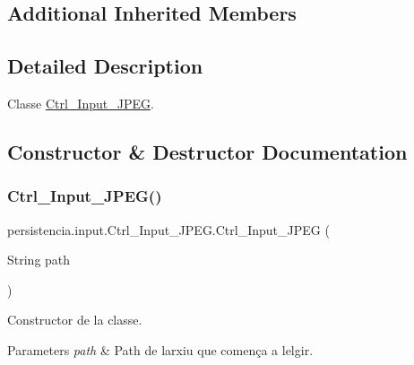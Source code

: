 \subsection*{Additional Inherited Members}


\subsection{Detailed Description}
Classe \hyperlink{classpersistencia_1_1input_1_1Ctrl__Input__JPEG}{Ctrl\+\_\+\+Input\+\_\+\+J\+P\+EG}. 

\subsection{Constructor \& Destructor Documentation}
\mbox{\label{classpersistencia_1_1input_1_1Ctrl__Input__JPEG_aa7d81dfa6240a7ee82e5188fc2600c58}} 
\subsubsection{\texorpdfstring{Ctrl\+\_\+\+Input\+\_\+\+J\+P\+E\+G()}{Ctrl\_Input\_JPEG()}\hspace{0.1cm}{\footnotesize\ttfamily [1/2]}}
{\footnotesize\ttfamily persistencia.\+input.\+Ctrl\+\_\+\+Input\+\_\+\+J\+P\+E\+G.\+Ctrl\+\_\+\+Input\+\_\+\+J\+P\+EG (\begin{DoxyParamCaption}\item[{String}]{path }\end{DoxyParamCaption})\hspace{0.3cm}{\ttfamily [inline]}}



Constructor de la classe. 


\begin{DoxyParams}{Parameters}
{\em path} & Path de l\textquotesingle{}arxiu que comença a lelgir. \\
\hline
\end{DoxyParams}

